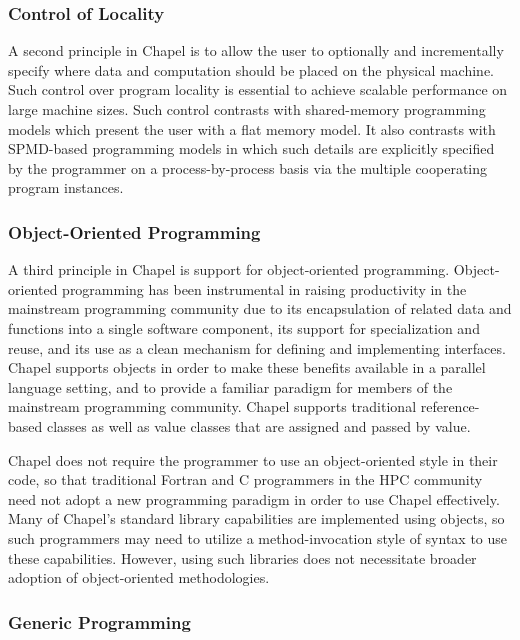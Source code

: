 \subsubsection{Control of Locality}

A second principle in Chapel is to allow the user to optionally and
incrementally specify where data and computation should be placed on
the physical machine.  Such control over program locality is essential
to achieve scalable performance on large machine sizes.  Such control
contrasts with shared-memory programming models which present the user
with a flat memory model.  It also contrasts with SPMD-based
programming models in which such details are explicitly specified by
the programmer on a process-by-process basis via the multiple
cooperating program instances.

\subsubsection{Object-Oriented Programming}

A third principle in Chapel is support for object-oriented
programming.  Object-oriented programming has been instrumental in
raising productivity in the mainstream programming community due to
its encapsulation of related data and functions into a single software
component, its support for specialization and reuse, and its use as a
clean mechanism for defining and implementing interfaces.  Chapel
supports objects in order to make these benefits available in a
parallel language setting, and to provide a familiar paradigm for
members of the mainstream programming community.  Chapel supports
traditional reference-based classes as well as value classes that are
assigned and passed by value.

Chapel does not require the programmer to use an object-oriented style
in their code, so that traditional Fortran and C programmers in the
HPC community need not adopt a new programming paradigm in order to
use Chapel effectively.  Many of Chapel's standard library
capabilities are implemented using objects, so such programmers may
need to utilize a method-invocation style of syntax to use these
capabilities.  However, using such libraries does not necessitate
broader adoption of object-oriented methodologies.

\subsubsection{Generic Programming}

